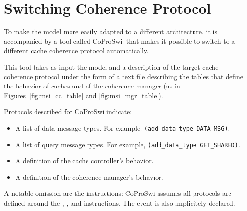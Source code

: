 \section{Switching Coherence Protocol}
\label{sec:protocol_switching}
To make the model more easily adapted to a different architecture,
it is accompanied by a tool called CoProSwi, that makes it possible to switch
to a different cache coherence protocol automatically.

This tool takes as input the model and a description of
the target cache coherence protocol under the form of a text file describing
the tables that define the behavior of caches and of the coherence manager (as
in Figures~\ref{fig:msi_cc_table} and \ref{fig:msi_mgr_table}).

Protocols described for CoProSwi indicate:
\begin{itemize}
\item A list of data message types. For example, \lstinline!(add_data_type DATA_MSG)!.
\item
   A list of query message types. For example,
   \lstinline!(add_data_type GET_SHARED)!.
\item A definition of the cache controller's behavior.
\item A definition of the coherence manager's behavior.
\end{itemize}

A notable omission are the instructions: CoProSwi assumes all protocols are
defined around the \loadinstr{}, \storeinstr{}, and \evictinstr{} instructions.
The \ownquery{} event is also implicitely declared.

